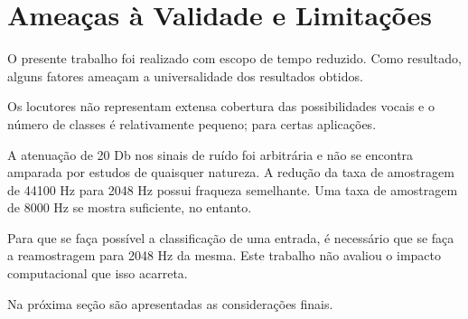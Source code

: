 
\section{Ameaças à Validade e Limitações}

O presente trabalho foi realizado com escopo de tempo reduzido. Como resultado,
alguns fatores ameaçam a universalidade dos resultados obtidos.

Os locutores não representam extensa cobertura das possibilidades vocais e o
número de classes é relativamente pequeno; para certas aplicações.

A atenuação de 20 Db nos sinais de ruído foi arbitrária e não se encontra
amparada por estudos de quaisquer natureza. A redução da taxa de amostragem de
44100 Hz para 2048 Hz possui fraqueza semelhante. Uma taxa de amostragem de
8000 Hz se mostra suficiente, no entanto.

Para que se faça possível a classificação de uma entrada, é necessário que se
faça a reamostragem para 2048 Hz da mesma. Este trabalho não avaliou o impacto
computacional que isso acarreta.

Na próxima seção são apresentadas as considerações finais.
